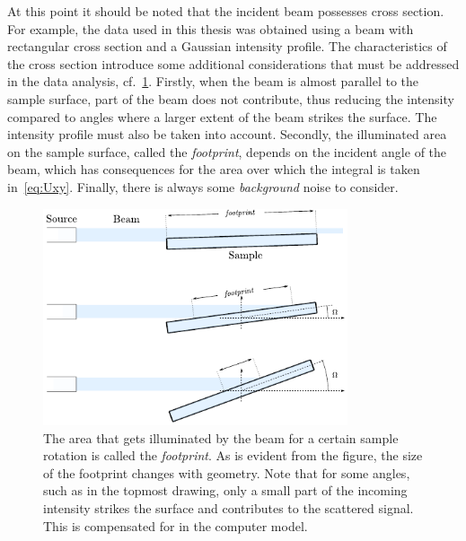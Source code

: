 \documentclass[10pt,twoside, b5paper,pdftex]{report}
\begin{document}
At this point it should be noted that the incident beam possesses cross section. For example, the data used in this thesis was obtained using a beam with rectangular cross section and a Gaussian intensity profile. The characteristics of the cross section introduce some additional considerations that must be addressed in the data analysis, cf.~\cref{fig:setup}.
Firstly, when the beam is almost parallel to the sample surface, part of the beam does not contribute, thus reducing the intensity compared to angles where a larger extent of the beam strikes the surface. The intensity profile must also be taken into account. Secondly, the illuminated area on the sample surface, called the {\it footprint}, depends on the incident angle of the beam, which has consequences for the area over which the integral is taken in~\cref{eq:Uxy}. Finally, there is always some {\it background} noise to consider.

\begin{figure}[htbp]
	\begin{center}
		\includegraphics[width=0.8\textwidth]{figures/setup_LOW.pdf}		
	\end{center}
	\caption{The area that gets illuminated by the beam for a certain sample rotation is called the {\it footprint}. As is evident from the figure, the size of the  footprint changes with geometry. Note that for some angles, such as in the topmost drawing, only a small part of the incoming intensity strikes the surface and contributes to the scattered signal. This is compensated for in the computer model. \label{fig:setup}}
\end{figure}
\end{document}
